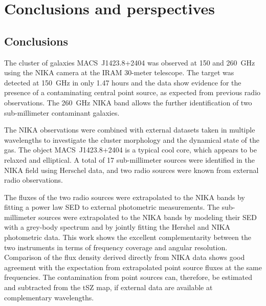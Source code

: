 \documentclass[twocolumn,traditabstract]{aa}
\begin{document}
\section{Conclusions and perspectives}\label{sec:conclusions}
\subsection{Conclusions}
The cluster of galaxies \mbox{MACS~J1423.8+2404} was observed at 150 and 260~GHz using the NIKA camera at the IRAM 30-meter telescope. The target was detected at 150~GHz in only 1.47 hours and the data show evidence for the presence of a contaminating central point source, as expected from previous radio observations. The 260~GHz NIKA band allows the further identification of two sub-millimeter contaminant galaxies.

The NIKA observations were combined with external datasets taken in multiple wavelengths to investigate the cluster morphology and the dynamical state of the gas. The object \mbox{MACS~J1423.8+2404} is a typical cool core, which appears to be relaxed and elliptical. A total of 17 sub-millimeter sources were identified in the NIKA field using Herschel data, and two radio sources were known from external radio observations.

The fluxes of the two radio sources were extrapolated to the NIKA bands by fitting a power law SED to external photometric measurements. The sub-millimeter sources were extrapolated to the NIKA bands by modeling their SED with a grey-body spectrum and by jointly fitting the Hershel and NIKA photometric data. This work shows the excellent complementarity between the two instruments in terms of frequency coverage and angular resolution. Comparison of the flux density derived directly from NIKA data  shows  good agreement with the expectation from extrapolated point source fluxes at the same frequencies. The contamination from point sources can, therefore, be estimated and subtracted from the tSZ map, if external data are available at complementary wavelengths.
\end{document}
